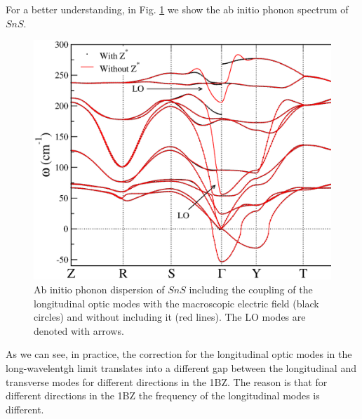 For a better understanding, in Fig. \ref{LOTOsplitting} we show the ab initio phonon spectrum of $SnS$.
\begin{figure}[h]
\begin{center}
\includegraphics[width=0.9\linewidth]{Figures/charges.eps}
\caption[$SnS$ phonon spectrum]{Ab initio phonon dispersion of $SnS$ including the coupling of the longitudinal optic modes with the macroscopic electric field (black circles) and without including it (red lines). The LO modes are denoted with arrows.}
\label{LOTOsplitting}
\end{center}
\end{figure}
As we can see, in practice, the correction for the longitudinal optic modes in the long-wavelentgh limit translates into a different gap between the longitudinal and transverse modes for different directions in the 1BZ. The reason 
is that for different directions in the 1BZ the frequency of the longitudinal modes is different.

